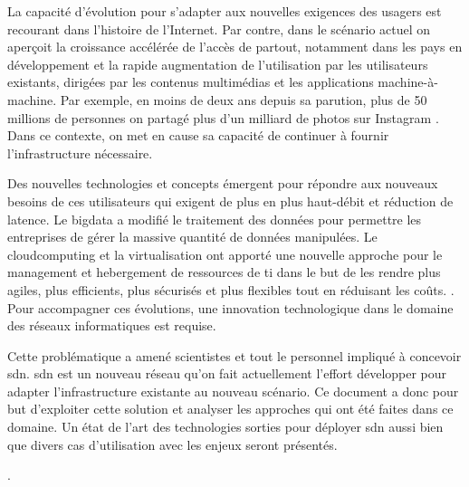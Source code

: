 \par
La capacité d'évolution pour s'adapter aux nouvelles exigences des usagers est recourant dans l'histoire de l'Internet. \cite{InternetSustainGrowth}
Par contre, dans le scénario actuel on aperçoit la croissance accélérée de l'accès de partout, notamment dans les pays en développement et la rapide augmentation de l'utilisation par les utilisateurs existants, dirigées par les contenus multimédias et les applications machine-à-machine. Par exemple, en moins de deux ans depuis sa parution, plus de 50 millions de personnes on partagé plus d'un milliard de photos sur Instagram \cite{deuxAnsInstagram}.
Dans ce contexte, on met en cause sa capacité de continuer à fournir l'infrastructure nécessaire.
\par
Des nouvelles technologies et concepts émergent pour répondre aux nouveaux besoins de ces utilisateurs qui exigent de plus en plus haut-débit et réduction de latence. Le \gls{bigdata} a modifié le traitement des données pour permettre les entreprises de gérer la massive quantité de données manipulées. \cite{IMBigData} Le \gls{cloudcomputing} et la \gls{virtualisation} ont apporté une nouvelle approche pour le management et hebergement de ressources de \gls{ti} dans le but de les rendre plus agiles, plus efficients, plus sécurisés et plus flexibles tout en réduisant les coûts. \cite{CloudComputingIntelVision}. Pour accompagner ces évolutions, une innovation technologique dans le domaine des réseaux informatiques est requise.
\par
Cette problématique a amené scientistes et tout le personnel impliqué à concevoir \gls{sdn}. \gls{sdn} est un nouveau  réseau qu'on fait actuellement l'effort développer pour adapter l'infrastructure existante au nouveau scénario.\cite{OpenFlowStanford} Ce document a donc pour but d'exploiter cette solution et analyser les approches qui ont été faites dans ce domaine. Un état de l'art des technologies sorties pour déployer \gls{sdn} aussi bien que divers cas d'utilisation avec les enjeux seront présentés.
\par
[un paragraphe pour le plan du texte (de quoi parle chaque section)]
\par
[Un paragraphe pour conclure l'intro et laisser les pistes de mon point de vue et les conclusions trouvées].


